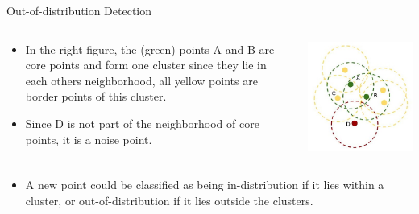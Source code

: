 \documentclass[11pt,compress,t,notes=noshow, xcolor=table]{beamer}
\begin{document}
\begin{frame}{Out-of-distribution Detection}
\vspace{-0.6cm}
\begin{columns}
	\begin{column}{0.65\textwidth}
		\begin{itemize}
			\item In the right figure, the (green) points A and B are core points and form one cluster since they lie in each others neighborhood, all yellow points are border points of this cluster. 
			\item Since D is not part of the neighborhood of core points, it is a noise point. 
		\end{itemize}
	\end{column}
	\begin{column}{0.3\textwidth}
		\vspace{-0.4cm}
		\begin{center}
			\includegraphics[width=1\textwidth]{figure/dbscan.jpg}
		\end{center}
	\end{column}
\end{columns}
\begin{itemize}
		\item A new point could be classified as being in-distribution if it lies within a cluster, or out-of-distribution if it lies outside the clusters. 

\end{itemize}
\end{frame}
\end{document}
